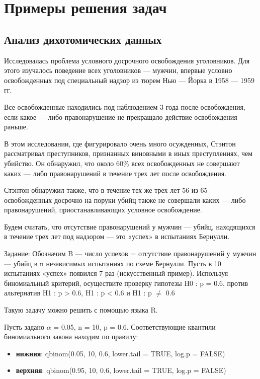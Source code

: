 \documentclass[14pt,a4paper]{scrartcl}
\begin{document}
    \newpage
    \section[Примеры решения задач]{Примеры решения задач}
    \subsection[Анализ дихотомических данных]{Анализ дихотомических данных}
    Исследовалась проблема условного досрочного освобождения уголовников. Для этого изучалось поведение всех уголовников --- мужчин, впервые условно освобожденных под специальный надзор из тюрем Нью --- Йорка в 1958 --- 1959 гг.

	Все освобожденные находились под наблюдением 3 года после освобождения, если какое --- либо правонарушение не прекращало действие освобождения раньше.

	В этом исследовании, где фигурировало очень много осужденных, Стэнтон рассматривал преступников, признанных виновными в иных преступлениях, чем убийство. Он обнаружил, что около 60\% всех освобожденных не совершают каких --- либо правонарушений в течение трех лет после освобождения.

	Стэнтон обнаружил также, что в течение тех же трех лет 56 из 65 освобожденных досрочно на поруки убийц также не совершали каких --- либо правонарушений, приостанавливающих условное освобождение.

	Будем считать, что отсутствие правонарушений у мужчин --- убийц, находящихся в течение трех лет под надзором --- это «успех» в испытаниях Бернулли.

	Задание: Обозначим B --- число успехов = отсутствие правонарушений у мужчин --- убийц в n независимых испытаниях по схеме Бернулли. Пусть в 10 испытаниях «успех» появился 7 раз (искусственный пример). Используя биномиальный критерий, осуществите проверку гипотезы H0 : p = 0.6, против альтернатив H1 : p > 0.6, H1 : p < 0.6 и H1 : p $\ne$ 0.6

	Такую задачу можно решить с помощью языка R.

	Пусть задано $\alpha$ = 0.05, n = 10, p = 0.6. Соответствующие квантили биномиального закона находим по правилу:
    \begin{itemize}
        \item \textbf{нижняя}: qbinom(0.05, 10, 0.6, lower.tail = TRUE, log.p = FALSE)
        \item \textbf{верхняя}: qbinom(0.95, 10, 0.6, lower.tail = TRUE, log.p = FALSE)
    \end{itemize}
\end{document}
